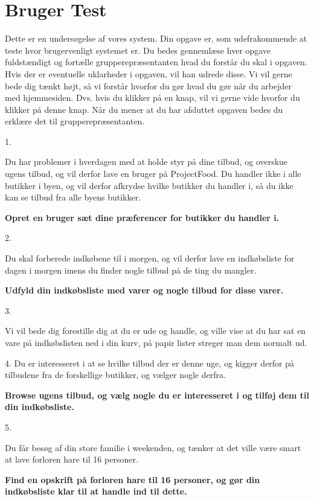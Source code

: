 \chapter{Bruger Test}

Dette er en undersøgelse af vores system. Din opgave er, som udefrakommende at teste hvor brugervenligt systemet er. Du bedes gennemlæse hver opgave fuldstændigt og fortælle grupperepræsentanten hvad du forstår du skal i opgaven. Hvis der er eventuelle uklarheder i opgaven, vil han udrede disse. Vi vil gerne bede dig tænkt højt, så vi forstår hvorfor du gør hvad du gør når du arbejder med hjemmesiden. Dvs. hvis du klikker på en knap, vil vi gerne vide hvorfor du klikker på denne knap. Når du mener at du har afsluttet opgaven bedes du erklære det til grupperepræsentanten.

1.

Du har problemer i hverdagen med at holde styr på dine tilbud, og overskue ugens tilbud, og vil derfor lave en bruger på ProjectFood.
Du handler ikke i alle butikker i byen, og vil derfor afkrydse hvilke butikker du handler i, så du ikke kan se tilbud fra alle byens butikker.

\textbf{Opret en bruger sæt dine præferencer for butikker du handler i. }

2. 

Du skal forberede indkøbene til i morgen, og vil derfor lave en indkøbsliste for dagen i morgen imens du finder nogle tilbud på de ting du mangler.

\textbf{Udfyld din indkøbsliste med varer og nogle tilbud for disse varer.}

3.

Vi vil bede dig forestille dig at du er ude og handle, og ville vise at du har sat en vare på indkøbslisten ned i din kurv, på papir lister streger man dem normalt ud.

4.
Du er interesseret i at se hvilke tilbud der er denne uge, og kigger derfor på tilbudene fra de forskellige butikker, og vælger nogle derfra.

\textbf{Browse ugens tilbud, og vælg nogle du er interesseret i og tilføj dem til din indkøbsliste.}

5.

Du får besøg af din store familie i weekenden, og tænker at det ville være smart at lave forloren hare til 16 personer. 

\textbf{Find en opskrift på forloren hare til 16 personer, og gør din indkøbsliste klar til at handle ind til dette.}

